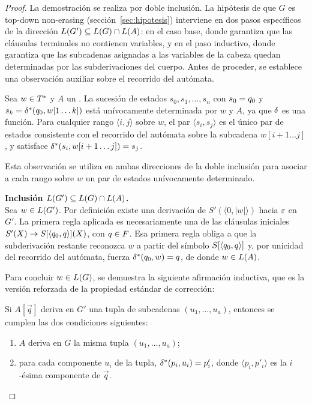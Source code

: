 \begin{proof}
La demostración se realiza por doble inclusión. La hipótesis de que $G$ es top-down non-erasing (sección~\ref{sec:hipotesis}) interviene en dos pasos específicos de la dirección $L(G') \subseteq L(G) \cap L(A)$: en el caso base, donde garantiza que las cláusulas terminales no contienen variables, y en el paso inductivo, donde garantiza que las subcadenas asignadas a las variables de la cabeza quedan determinadas por las subderivaciones del cuerpo. Antes de proceder, se establece una observación auxiliar sobre el recorrido del autómata.

\begin{observacion}
\label{obs:recorrido}
Sea $w \in T^{*}$ y $A$ un \AFD. La sucesión de estados $s_0, s_1, \dots, s_n$ con $s_0 = q_0$ y $s_k = \delta^{*}(q_0, w[1 \ldots k])$ está unívocamente determinada por $w$ y $A$, ya que $\delta$ es una función. Para cualquier rango $\langle i, j \rangle$ sobre $w$, el par $\langle s_i, s_j \rangle$ es el único par de estados consistente con el recorrido del autómata sobre la subcadena $w[i+1 \ldots j]$, y satisface $\delta^{*}(s_i, w[i+1 \ldots j]) = s_j$.
\end{observacion}

Esta observación se utiliza en ambas direcciones de la doble inclusión para asociar a cada rango sobre $w$ un par de estados unívocamente determinado.

\medskip
\noindent\textbf{Inclusión $L(G') \subseteq L(G) \cap L(A)$.}\\
Sea $w \in L(G')$. Por definición existe una derivación de $S'(\langle 0, \lvert w \rvert \rangle)$ hacia $\varepsilon$ en $G'$. La primera regla aplicada es necesariamente una de las cláusulas iniciales $S'(X) \to S[\langle q_0, q \rangle](X)$, con $q \in F$. Esa primera regla obliga a que la subderivación restante reconozca $w$ a partir del símbolo $S[\langle q_0, q \rangle]$ y, por unicidad del recorrido del autómata, fuerza $\delta^{*}(q_0, w) = q$, de donde $w \in L(A)$.

Para concluir $w \in L(G)$, se demuestra la siguiente afirmación inductiva, que es la versión reforzada de la propiedad estándar de corrección:

\begin{afirmacion}
\label{afirm:induccion}
Si $A[\vec{q}]$ deriva en $G'$ una tupla de subcadenas $(u_1, \dots, u_a)$, entonces se cumplen las dos condiciones siguientes:
\begin{enumerate}
\item[(i)] $A$ deriva en $G$ la misma tupla $(u_1, \dots, u_a)$;
\item[(ii)] para cada componente $u_i$ de la tupla, $\delta^{*}(p_i, u_i) = p'_i$, donde $\langle p_i, p'_i \rangle$ es la $i$-ésima componente de $\vec{q}$.
\end{enumerate}
\end{afirmacion}


\end{proof}
